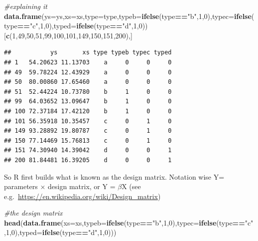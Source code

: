 \documentclass[
]{book}
\newenvironment{Shaded}{\begin{snugshade}}{\end{snugshade}}
\newcommand{\CommentTok}[1]{\textcolor[rgb]{0.56,0.35,0.01}{\textit{#1}}}
\newcommand{\DataTypeTok}[1]{\textcolor[rgb]{0.13,0.29,0.53}{#1}}
\newcommand{\DecValTok}[1]{\textcolor[rgb]{0.00,0.00,0.81}{#1}}
\newcommand{\KeywordTok}[1]{\textcolor[rgb]{0.13,0.29,0.53}{\textbf{#1}}}
\newcommand{\NormalTok}[1]{#1}
\newcommand{\OperatorTok}[1]{\textcolor[rgb]{0.81,0.36,0.00}{\textbf{#1}}}
\newcommand{\StringTok}[1]{\textcolor[rgb]{0.31,0.60,0.02}{#1}}
\begin{document}
\begin{Shaded}
\begin{Highlighting}[]
\CommentTok{#explaining it}
\KeywordTok{data.frame}\NormalTok{(}\DataTypeTok{ys=}\NormalTok{ys,}\DataTypeTok{xs=}\NormalTok{xs,}\DataTypeTok{type=}\NormalTok{type,}\DataTypeTok{typeb=}\KeywordTok{ifelse}\NormalTok{(type}\OperatorTok{==}\StringTok{"b"}\NormalTok{,}\DecValTok{1}\NormalTok{,}\DecValTok{0}\NormalTok{),}\DataTypeTok{typec=}\KeywordTok{ifelse}\NormalTok{(type}\OperatorTok{==}\StringTok{"c"}\NormalTok{,}\DecValTok{1}\NormalTok{,}\DecValTok{0}\NormalTok{),}\DataTypeTok{typed=}\KeywordTok{ifelse}\NormalTok{(type}\OperatorTok{==}\StringTok{"d"}\NormalTok{,}\DecValTok{1}\NormalTok{,}\DecValTok{0}\NormalTok{))[}\KeywordTok{c}\NormalTok{(}\DecValTok{1}\NormalTok{,}\DecValTok{49}\NormalTok{,}\DecValTok{50}\NormalTok{,}\DecValTok{51}\NormalTok{,}\DecValTok{99}\NormalTok{,}\DecValTok{100}\NormalTok{,}\DecValTok{101}\NormalTok{,}\DecValTok{149}\NormalTok{,}\DecValTok{150}\NormalTok{,}\DecValTok{151}\NormalTok{,}\DecValTok{200}\NormalTok{),]}
\end{Highlighting}
\end{Shaded}

\begin{verbatim}
##           ys       xs type typeb typec typed
## 1   54.20623 11.13703    a     0     0     0
## 49  59.78224 12.43929    a     0     0     0
## 50  80.00860 17.65460    a     0     0     0
## 51  52.44224 10.73780    b     1     0     0
## 99  64.03652 13.09647    b     1     0     0
## 100 72.37184 17.42120    b     1     0     0
## 101 56.35918 10.35457    c     0     1     0
## 149 93.28892 19.80787    c     0     1     0
## 150 77.14469 15.76813    c     0     1     0
## 151 74.30940 14.39042    d     0     0     1
## 200 81.84481 16.39205    d     0     0     1
\end{verbatim}

So R first builds what is known as the design matrix. Notation wise Y= parameters \(\times\) design matrix, or Y = \(\beta\)X (see e.g.~\url{https://en.wikipedia.org/wiki/Design_matrix})

\begin{Shaded}
\begin{Highlighting}[]
\CommentTok{#the design matrix}
\KeywordTok{head}\NormalTok{(}\KeywordTok{data.frame}\NormalTok{(}\DataTypeTok{xs=}\NormalTok{xs,}\DataTypeTok{typeb=}\KeywordTok{ifelse}\NormalTok{(type}\OperatorTok{==}\StringTok{"b"}\NormalTok{,}\DecValTok{1}\NormalTok{,}\DecValTok{0}\NormalTok{),}\DataTypeTok{typec=}\KeywordTok{ifelse}\NormalTok{(type}\OperatorTok{==}\StringTok{"c"}\NormalTok{,}\DecValTok{1}\NormalTok{,}\DecValTok{0}\NormalTok{),}\DataTypeTok{typed=}\KeywordTok{ifelse}\NormalTok{(type}\OperatorTok{==}\StringTok{"d"}\NormalTok{,}\DecValTok{1}\NormalTok{,}\DecValTok{0}\NormalTok{)))}
\end{Highlighting}
\end{Shaded}
\end{document}
